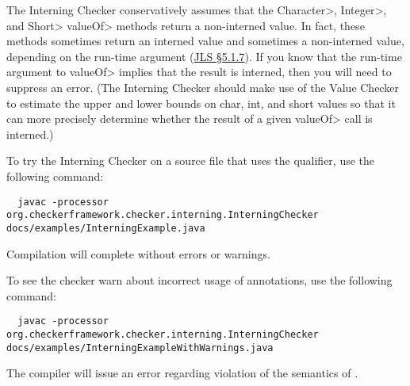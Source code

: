 

The Interning Checker conservatively assumes that the \<Character>, \<Integer>,
and \<Short> \<valueOf> methods return a non-interned value.  In fact, these
methods sometimes return an interned value and sometimes a non-interned
value, depending on the run-time argument (\href{https://docs.oracle.com/javase/specs/jls/se11/html/jls-5.html#jls-5.1.7}{JLS
\S5.1.7}).  If you know that the run-time argument to \<valueOf> implies that
the result is interned, then you will need to suppress an error.
(The Interning Checker should make use of the Value Checker to estimate the upper
and lower bounds on char, int, and short values so that it can more
precisely determine whether the result of a given \<valueOf> call is
interned.)




To try the Interning Checker on a source file that uses the  qualifier,
use the following command:

\begin{mysmall}
\begin{Verbatim}
  javac -processor org.checkerframework.checker.interning.InterningChecker docs/examples/InterningExample.java
\end{Verbatim}
\end{mysmall}

\noindent
Compilation will complete without errors or warnings.

To see the checker warn about incorrect usage of annotations, use the following
command:

\begin{mysmall}
\begin{Verbatim}
  javac -processor org.checkerframework.checker.interning.InterningChecker docs/examples/InterningExampleWithWarnings.java
\end{Verbatim}
\end{mysmall}

\noindent
The compiler will issue an error regarding violation of the semantics of
.


